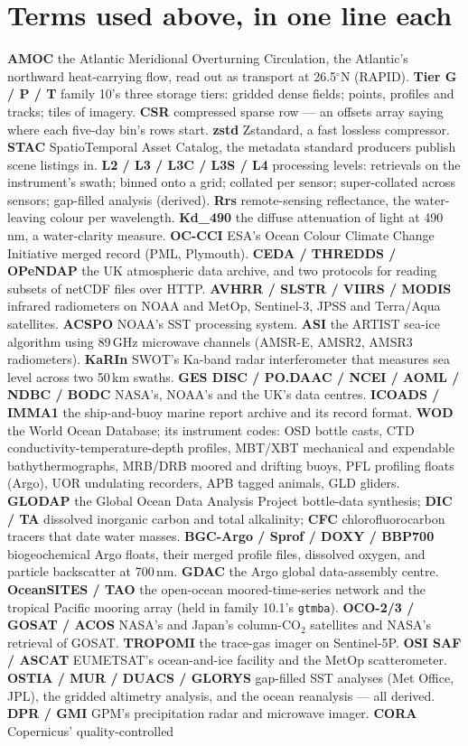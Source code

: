 \documentclass[10pt]{article}
\newcommand{\code}[1]{\texttt{#1}}
\begin{document}
\section*{Terms used above, in one line each}
\footnotesize
\textbf{AMOC} the Atlantic Meridional Overturning Circulation, the Atlantic's northward heat-carrying flow, read out as transport at 26.5$^\circ$N (RAPID). \textbf{Tier G / P / T} family 10's three storage tiers: gridded dense fields; points, profiles and tracks; tiles of imagery. \textbf{CSR} compressed sparse row --- an offsets array saying where each five-day bin's rows start. \textbf{zstd} Zstandard, a fast lossless compressor. \textbf{STAC} SpatioTemporal Asset Catalog, the metadata standard producers publish scene listings in. \textbf{L2 / L3 / L3C / L3S / L4} processing levels: retrievals on the instrument's swath; binned onto a grid; collated per sensor; super-collated across sensors; gap-filled analysis (derived). \textbf{Rrs} remote-sensing reflectance, the water-leaving colour per wavelength. \textbf{Kd\_490} the diffuse attenuation of light at 490\,nm, a water-clarity measure. \textbf{OC-CCI} ESA's Ocean Colour Climate Change Initiative merged record (PML, Plymouth). \textbf{CEDA / THREDDS / OPeNDAP} the UK atmospheric data archive, and two protocols for reading subsets of netCDF files over HTTP. \textbf{AVHRR / SLSTR / VIIRS / MODIS} infrared radiometers on NOAA and MetOp, Sentinel-3, JPSS and Terra/Aqua satellites. \textbf{ACSPO} NOAA's SST processing system. \textbf{ASI} the ARTIST sea-ice algorithm using 89\,GHz microwave channels (AMSR-E, AMSR2, AMSR3 radiometers). \textbf{KaRIn} SWOT's Ka-band radar interferometer that measures sea level across two 50\,km swaths. \textbf{GES DISC / PO.DAAC / NCEI / AOML / NDBC / BODC} NASA's, NOAA's and the UK's data centres. \textbf{ICOADS / IMMA1} the ship-and-buoy marine report archive and its record format. \textbf{WOD} the World Ocean Database; its instrument codes: OSD bottle casts, CTD conductivity-temperature-depth profiles, MBT/XBT mechanical and expendable bathythermographs, MRB/DRB moored and drifting buoys, PFL profiling floats (Argo), UOR undulating recorders, APB tagged animals, GLD gliders. \textbf{GLODAP} the Global Ocean Data Analysis Project bottle-data synthesis; \textbf{DIC / TA} dissolved inorganic carbon and total alkalinity; \textbf{CFC} chlorofluorocarbon tracers that date water masses. \textbf{BGC-Argo / Sprof / DOXY / BBP700} biogeochemical Argo floats, their merged profile files, dissolved oxygen, and particle backscatter at 700\,nm. \textbf{GDAC} the Argo global data-assembly centre. \textbf{OceanSITES / TAO} the open-ocean moored-time-series network and the tropical Pacific mooring array (held in family 10.1's \code{gtmba}). \textbf{OCO-2/3 / GOSAT / ACOS} NASA's and Japan's column-CO$_2$ satellites and NASA's retrieval of GOSAT. \textbf{TROPOMI} the trace-gas imager on Sentinel-5P. \textbf{OSI SAF / ASCAT} EUMETSAT's ocean-and-ice facility and the MetOp scatterometer. \textbf{OSTIA / MUR / DUACS / GLORYS} gap-filled SST analyses (Met Office, JPL), the gridded altimetry analysis, and the ocean reanalysis --- all derived. \textbf{DPR / GMI} GPM's precipitation radar and microwave imager. \textbf{CORA} Copernicus' quality-controlled 
\end{document}
